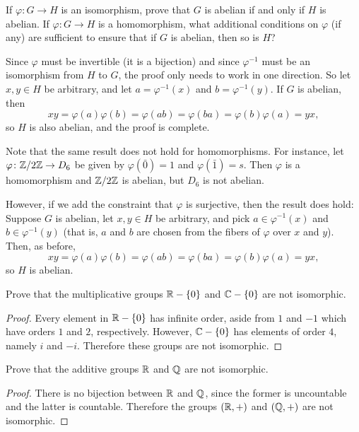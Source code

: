  If $\varphi\colon G\to H$ is an isomorphism, prove that $G$
is abelian if and only if $H$ is abelian. If $\varphi\colon G\to H$ is
a homomorphism, what additional conditions on $\varphi$ (if any) are
sufficient to ensure that if $G$ is abelian, then so is $H$?
\begin{solution}
  Since $\varphi$ must be invertible (it is a bijection) and since
  $\varphi^{-1}$ must be an isomorphism from $H$ to $G$, the proof
  only needs to work in one direction. So let $x,y\in H$ be arbitrary,
  and let $a = \varphi^{-1}(x)$ and $b = \varphi^{-1}(y)$. If $G$ is
  abelian, then
  \begin{equation*}
    xy = \varphi(a)\varphi(b) = \varphi(ab) = \varphi(ba)
    = \varphi(b)\varphi(a) = yx,
  \end{equation*}
  so $H$ is also abelian, and the proof is complete.

  Note that the same result does not hold for homomorphisms. For
  instance, let $\varphi\colon\mathbb{Z}/2\mathbb{Z}\to D_6$ be given by
  $\varphi(\bar0) = 1$ and $\varphi(\bar1) = s$. Then $\varphi$ is a
  homomorphism and $\mathbb{Z}/2\mathbb{Z}$ is abelian, but $D_6$ is not abelian.

  However, if we add the constraint that $\varphi$ is surjective, then
  the result does hold: Suppose $G$ is abelian, let $x,y\in H$ be
  arbitrary, and pick $a\in\varphi^{-1}(x)$ and $b\in\varphi^{-1}(y)$
  (that is, $a$ and $b$ are chosen from the fibers of $\varphi$ over
  $x$ and $y$). Then, as before,
  \begin{equation*}
    xy = \varphi(a)\varphi(b) = \varphi(ab) = \varphi(ba)
    = \varphi(b)\varphi(a) = yx,
  \end{equation*}
  so $H$ is abelian.
\end{solution}

 Prove that the multiplicative groups $\mathbb{R}-\{0\}$ and
$\mathbb{C}-\{0\}$ are not isomorphic.
\begin{proof}
  Every element in $\mathbb{R}-\{0\}$ has infinite order, aside from $1$ and
  $-1$ which have orders $1$ and $2$, respectively. However,
  $\mathbb{C}-\{0\}$ has elements of order $4$, namely $i$ and $-i$. Therefore
  these groups are not isomorphic.
\end{proof}

 Prove that the additive groups $\mathbb{R}$ and $\mathbb{Q}$ are not
isomorphic.
\begin{proof}
  There is no bijection between $\mathbb{R}$ and $\mathbb{Q}$, since the former is
  uncountable and the latter is countable. Therefore the groups
  $(\mathbb{R},+)$ and $(\mathbb{Q},+)$ are not isomorphic.
\end{proof}

